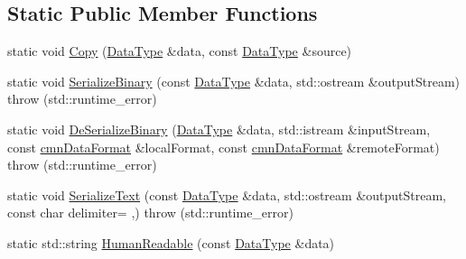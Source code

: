 \subsection*{Static Public Member Functions}
\begin{DoxyCompactItemize}
\item 
static void \hyperlink{classcmn_data_3_01vct_matrix_rotation3_3_01__element_type_00_01__row_major_01_4_01_4_ab8b28fb13fa4d47931f9d0d872275304}{Copy} (\hyperlink{classcmn_data_3_01vct_matrix_rotation3_3_01__element_type_00_01__row_major_01_4_01_4_a16ee28dba714864959664e5a1567db82}{Data\+Type} \&data, const \hyperlink{classcmn_data_3_01vct_matrix_rotation3_3_01__element_type_00_01__row_major_01_4_01_4_a16ee28dba714864959664e5a1567db82}{Data\+Type} \&source)
\item 
static void \hyperlink{classcmn_data_3_01vct_matrix_rotation3_3_01__element_type_00_01__row_major_01_4_01_4_a4e7912d305c127eeb3eab553b09a0c69}{Serialize\+Binary} (const \hyperlink{classcmn_data_3_01vct_matrix_rotation3_3_01__element_type_00_01__row_major_01_4_01_4_a16ee28dba714864959664e5a1567db82}{Data\+Type} \&data, std\+::ostream \&output\+Stream)  throw (std\+::runtime\+\_\+error)
\item 
static void \hyperlink{classcmn_data_3_01vct_matrix_rotation3_3_01__element_type_00_01__row_major_01_4_01_4_a61271fbc1aff20b4406ab77b0923acee}{De\+Serialize\+Binary} (\hyperlink{classcmn_data_3_01vct_matrix_rotation3_3_01__element_type_00_01__row_major_01_4_01_4_a16ee28dba714864959664e5a1567db82}{Data\+Type} \&data, std\+::istream \&input\+Stream, const \hyperlink{classcmn_data_format}{cmn\+Data\+Format} \&local\+Format, const \hyperlink{classcmn_data_format}{cmn\+Data\+Format} \&remote\+Format)  throw (std\+::runtime\+\_\+error)
\item 
static void \hyperlink{classcmn_data_3_01vct_matrix_rotation3_3_01__element_type_00_01__row_major_01_4_01_4_a943b3341e5f9e0449b758aa04522c5b5}{Serialize\+Text} (const \hyperlink{classcmn_data_3_01vct_matrix_rotation3_3_01__element_type_00_01__row_major_01_4_01_4_a16ee28dba714864959664e5a1567db82}{Data\+Type} \&data, std\+::ostream \&output\+Stream, const char delimiter= \textquotesingle{},\textquotesingle{})  throw (std\+::runtime\+\_\+error)
\item 
static std\+::string \hyperlink{classcmn_data_3_01vct_matrix_rotation3_3_01__element_type_00_01__row_major_01_4_01_4_a0246b0ae35fd2c183f8104420a596426}{Human\+Readable} (const \hyperlink{classcmn_data_3_01vct_matrix_rotation3_3_01__element_type_00_01__row_major_01_4_01_4_a16ee28dba714864959664e5a1567db82}{Data\+Type} \&data)

\end{DoxyCompactItemize}

